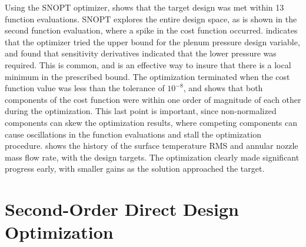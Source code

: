 Using the SNOPT optimizer,  shows that the target
design was met within 13 function evaluations.  SNOPT explores the entire design
space, as is shown in the second function evaluation, where a spike in the cost
function occurred.   indicates that the optimizer tried
the upper bound for the plenum pressure design variable, and found that
sensitivity derivatives indicated that the lower pressure was required. This is
common, and is an effective way to insure that there is a local minimum in the
prescribed bound.  The optimization terminated when the cost function value was
less than the tolerance of $10^{-8}$, and  shows
that both components of the cost function were within one order of magnitude of
each other during the optimization.  This last point is important, since
non-normalized components can skew the optimization results, where competing
components can cause oscillations in the function evaluations and stall the
optimization procedure.   shows the history of the
surface temperature RMS and annular nozzle mass flow rate, with the design
targets.  The optimization clearly made significant progress early, with smaller
gains as the solution approached the target.

\section{Second-Order Direct Design Optimization}
\label{sec:2nd-order-direct-design}

